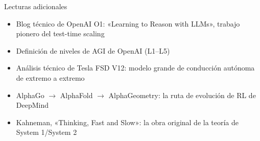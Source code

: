 \documentclass[a4paper]{article}
\begin{document}
\begin{knowledgebox}{Lecturas adicionales}
\begin{itemize}
\item Blog técnico de OpenAI O1: «Learning to Reason with LLMs», trabajo pionero del test-time scaling
\item Definición de niveles de AGI de OpenAI (L1--L5)
\item Análisis técnico de Tesla FSD V12: modelo grande de conducción autónoma de extremo a extremo
\item AlphaGo $\rightarrow$ AlphaFold $\rightarrow$ AlphaGeometry: la ruta de evolución de RL de DeepMind
\item Kahneman, «Thinking, Fast and Slow»: la obra original de la teoría de System 1/System 2
\end{itemize}
\end{knowledgebox}

\end{document}
